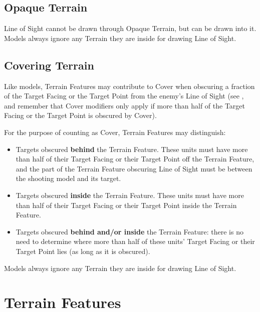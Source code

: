 \subsection{Opaque Terrain}
\label{opaque_terrain}

Line of Sight cannot be drawn through Opaque Terrain, but can be drawn into it. Models always ignore any Terrain they are inside for drawing Line of Sight.

\subsection{Covering Terrain}
\label{covering_terrain}

Like models, Terrain Features may contribute to Cover when obscuring a fraction of the Target Facing or the Target Point from the enemy's Line of Sight (see , and remember that Cover modifiers only apply if more than half of the Target Facing or the Target Point is obscured by Cover).

For the purpose of counting as Cover, Terrain Features may distinguish:

\begin{itemize}
	\item Targets obscured \textbf{behind} the Terrain Feature. These units must have more than half of their Target Facing or their Target Point off the Terrain Feature, and the part of the Terrain Feature obscuring Line of Sight must be between the shooting model and its target.
	\item Targets obscured \textbf{inside} the Terrain Feature. These units must have more than half of their Target Facing or their Target Point inside the Terrain Feature.
	\item Targets obscured \textbf{behind and/or inside} the Terrain Feature: there is no need to determine where more than half of these units' Target Facing or their Target Point lies (as long as it is obscured).
\end{itemize}

Models always ignore any Terrain they are inside for drawing Line of Sight.

\columnbreak

\section{Terrain Features}
\label{terrain_features}

